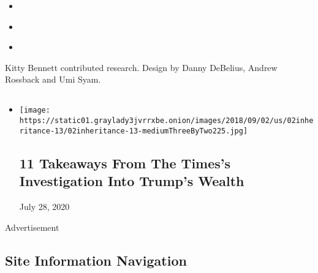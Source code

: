 \begin{itemize}
\tightlist
\item
  \href{https://www.nytimes3xbfgragh.onion/2018/10/02/us/politics/donald-trump-wealth-fred-trump.html}{}
\item
  \href{undefined/interactive/2018/10/02/us/politics/trump-family-wealth.html}{}
\item
  \href{https://www.nytimes3xbfgragh.onion/2018/10/02/insider/donald-trump-fred-tax-schemes-wealth.html}{}
\end{itemize}

Kitty Bennett contributed research. Design by Danny DeBelius, Andrew
Rossback and Umi Syam.

\subsection{}

\begin{itemize}
\item
  \href{https://www.nytimes3xbfgragh.onion/2018/10/02/us/politics/donald-trump-wealth-fred-trump.html}{}

  \texttt{[image: https://static01.graylady3jvrrxbe.onion/images/2018/09/02/us/02inheritance-13/02inheritance-13-mediumThreeByTwo225.jpg]}

  \hypertarget{11-takeaways-from-the-timess-investigation-into-trumps-wealth}{%
  \subsection{11 Takeaways From The Times's Investigation Into Trump's
  Wealth}\label{11-takeaways-from-the-timess-investigation-into-trumps-wealth}}

  July 28, 2020
\end{itemize}

Advertisement

\hypertarget{site-information-navigation}{%
\subsection{Site Information
Navigation}\label{site-information-navigation}}

